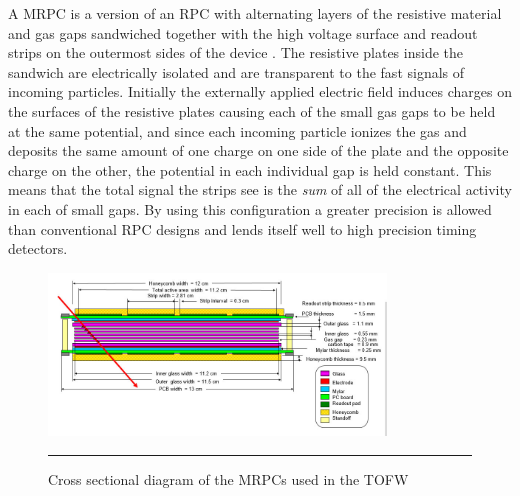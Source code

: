 A MRPC is a version of an RPC with alternating layers of the  resistive material and gas gaps sandwiched together with the high voltage surface and readout strips on the outermost sides of the device \citep{Akindinov:2000rq}. The resistive plates inside the sandwich are electrically isolated and are transparent to the fast signals of incoming particles. Initially the externally applied electric field induces charges on the surfaces of the resistive plates causing each of the small gas gaps to be held at the same potential, and since each incoming particle ionizes the gas and deposits the same amount of one charge on one side of the plate and the opposite charge on the other, the potential in each individual gap is held constant. This means that the total signal the strips see is the \textit{sum} of all of the electrical activity in each of small gaps. By using this configuration a greater precision is allowed than conventional RPC designs and lends itself well to high precision timing detectors.

\begin{figure}[ht!]
  \centering
    \includegraphics[width=0.8\textwidth]{Figures/MRPC_TOFW.jpg}
    \rule{35em}{0.5pt}
  \caption[Cross sectional diagram of the MRPCs used in the TOFW]{Cross sectional diagram of the MRPCs used in the TOFW}
  \label{fig:MRPCTOFW}
\end{figure}

